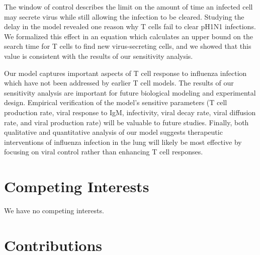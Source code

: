 \documentclass[10pt]{article}
\begin{document}
The window of control describes the limit on the amount of time an infected cell may secrete virus while still allowing the infection to be cleared.  Studying the delay in the model revealed one reason why T cells fail to clear pH1N1 infections.  We formalized this effect in an equation which calculates an upper bound on the search time for T cells to find new virus-secreting cells, and we showed that this value is consistent with the results of our sensitivity analysis.

Our model captures important aspects of T cell response to influenza infection which have not been addressed by earlier T cell models.  The results of our sensitivity analysis are important for future biological modeling and experimental design.  Empirical verification of the model's sensitive parameters (T cell production rate, viral response to IgM, infectivity, viral decay rate, viral diffusion rate, and viral production rate) will be valuable to future studies.  Finally, both qualitative and quantitative analysis of our model suggests therapeutic interventions of influenza infection in the lung will likely be most effective by focusing on viral control rather than enhancing T cell responses.







\section*{Competing Interests}

We have no competing interests.

\section*{Contributions}
\end{document}
